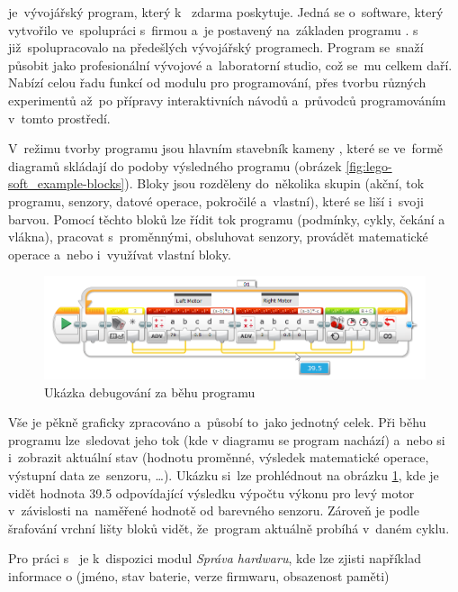 \legoSW{} je~vývojářský program, který \lego{} k~\EVthree{} zdarma poskytuje. 
Jedná se o~software, který \lego{} vytvořilo ve~spolupráci s~firmou \NI{} a~je postavený na~základen programu \labview{}. 
\lego{} s~\NI{} již~spolupracovalo na předešlých vývojářský programech. %
Program se~snaží působit jako profesionální vývojové a~laboratorní studio, což se~mu celkem daří.
Nabízí celou řadu funkcí od modulu pro programování, přes tvorbu různých experimentů až~po přípravy interaktivních návodů a~průvodců programováním v~tomto prostředí.



V~režimu tvorby programu jsou hlavním stavebník kameny \EVblocks, které se ve~formě diagramů skládají do podoby výsledného programu (obrázek \ref{fig:lego-soft_example-blocks}).
Bloky jsou rozděleny do~několika skupin (akční, tok programu, senzory, datové operace, pokročilé a~vlastní), které se liší i~svoji barvou. 
Pomocí těchto bloků lze řídit tok programu (podmínky, cykly, čekání a vlákna), pracovat s~proměnnými, obsluhovat senzory, provádět matematické operace a~nebo i~využívat vlastní bloky.

\begin{figure}[h]
	\centering
	\includegraphics[width=\textwidth]{images/lego-soft/lego-soft_live-debuging_line-advance.png}
	\caption{Ukázka debugování za běhu programu}
	\label{fig:lego-soft_live-debuging_line-advance}
\end{figure}

Vše je pěkně graficky zpracováno a~působí to~jako jednotný celek. 
Při běhu programu lze~sledovat jeho tok (kde v diagramu se program nachází) a~nebo si i~zobrazit aktuální stav (hodnotu proměnné, výsledek matematické operace, výstupní data ze~senzoru, \dots). 
Ukázku si~lze prohlédnout na obrázku \ref{fig:lego-soft_live-debuging_line-advance}, kde je vidět hodnota 39.5 odpovídající výsledku výpočtu výkonu pro levý motor v~závislosti na~naměřené hodnotě od barevného senzoru.
Zároveň je podle šrafování vrchní lišty bloků vidět, že~program aktuálně probíhá v~daném cyklu.

Pro práci s~ je k~dispozici modul {\it Správa hardwaru}, kde lze zjisti například informace o  (jméno, stav baterie, verze firmwaru, obsazenost paměti)

